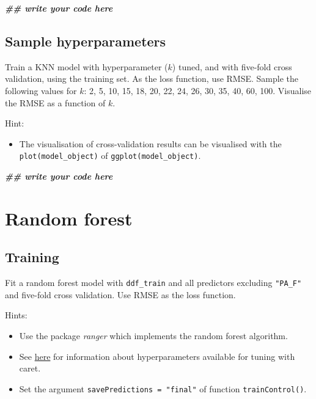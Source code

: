 \documentclass[
]{book}
\newenvironment{Shaded}{\begin{snugshade}}{\end{snugshade}}
\newcommand{\DocumentationTok}[1]{\textcolor[rgb]{0.56,0.35,0.01}{\textbf{\textit{#1}}}}
\providecommand{\tightlist}{%
  \setlength{\itemsep}{0pt}\setlength{\parskip}{0pt}}
\begin{document}
\begin{Shaded}
\begin{Highlighting}[]
\DocumentationTok{\#\# write your code here}
\end{Highlighting}
\end{Shaded}

\hypertarget{sample-hyperparameters}{%
\subsection{Sample hyperparameters}\label{sample-hyperparameters}}

Train a KNN model with hyperparameter (\(k\)) tuned, and with five-fold cross validation, using the training set. As the loss function, use RMSE. Sample the following values for \(k\): 2, 5, 10, 15, 18, 20, 22, 24, 26, 30, 35, 40, 60, 100. Visualise the RMSE as a function of \(k\).

Hint:

\begin{itemize}
\tightlist
\item
  The visualisation of cross-validation results can be visualised with the \texttt{plot(model\_object)} of \texttt{ggplot(model\_object)}.
\end{itemize}

\begin{Shaded}
\begin{Highlighting}[]
\DocumentationTok{\#\# write your code here}
\end{Highlighting}
\end{Shaded}

\hypertarget{random-forest-1}{%
\section{Random forest}\label{random-forest-1}}

\hypertarget{training-3}{%
\subsection{Training}\label{training-3}}

Fit a random forest model with \texttt{ddf\_train} and all predictors excluding \texttt{"PA\_F"} and five-fold cross validation. Use RMSE as the loss function.

Hints:

\begin{itemize}
\tightlist
\item
  Use the package \emph{ranger} which implements the random forest algorithm.
\item
  See \href{https://topepo.github.io/caret/available-models.html}{here} for information about hyperparameters available for tuning with caret.
\item
  Set the argument \texttt{savePredictions\ =\ "final"} of function \texttt{trainControl()}.
\end{itemize}
\end{document}
